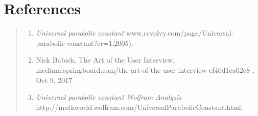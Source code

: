\documentclass[12pt]{report}
\begin{document}
\chapter{References}
\begin{quote}
    

\begin{enumerate}
\item  {\it Universal parabolic constant\/} www.revolvy.com/page/Universal-parabolic-constant?cr=1,2005).
\item Nick Babich, The Art of the User Interview, {medium.springboard.com/the-art-of-the-user-interview-cf40d1ca62e8 , Oct 9, 2017}
\item  {\it Universal parabolic constant Wolfram Analysis\\}  
http://mathworld.wolfram.com/UniversalParabolicConstant.html.
\end{enumerate}


        

\end{quote}
\end{document}
